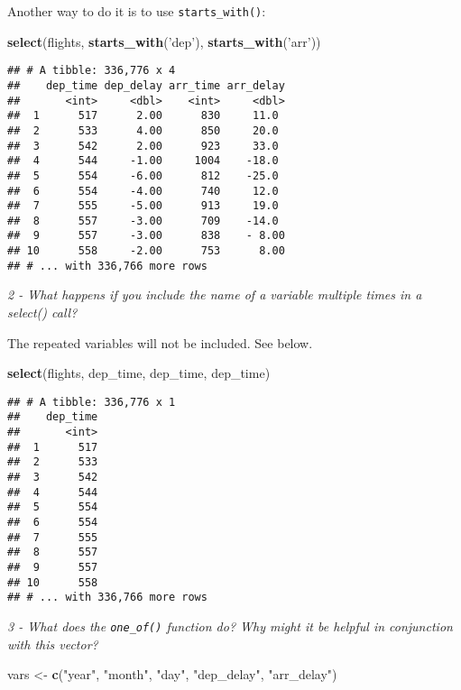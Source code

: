 \documentclass[]{article}
\newenvironment{Shaded}{\begin{snugshade}}{\end{snugshade}}
\newcommand{\KeywordTok}[1]{\textcolor[rgb]{0.13,0.29,0.53}{\textbf{#1}}}
\newcommand{\StringTok}[1]{\textcolor[rgb]{0.31,0.60,0.02}{#1}}
\newcommand{\NormalTok}[1]{#1}
\theoremstyle{definition}
\theoremstyle{definition}
\theoremstyle{definition}
\theoremstyle{remark}
\begin{document}
Another way to do it is to use \texttt{starts\_with()}:

\begin{Shaded}
\begin{Highlighting}[]
\KeywordTok{select}\NormalTok{(flights, }\KeywordTok{starts_with}\NormalTok{(}\StringTok{'dep'}\NormalTok{), }\KeywordTok{starts_with}\NormalTok{(}\StringTok{'arr'}\NormalTok{))}
\end{Highlighting}
\end{Shaded}

\begin{verbatim}
## # A tibble: 336,776 x 4
##    dep_time dep_delay arr_time arr_delay
##       <int>     <dbl>    <int>     <dbl>
##  1      517      2.00      830     11.0 
##  2      533      4.00      850     20.0 
##  3      542      2.00      923     33.0 
##  4      544     -1.00     1004    -18.0 
##  5      554     -6.00      812    -25.0 
##  6      554     -4.00      740     12.0 
##  7      555     -5.00      913     19.0 
##  8      557     -3.00      709    -14.0 
##  9      557     -3.00      838    - 8.00
## 10      558     -2.00      753      8.00
## # ... with 336,766 more rows
\end{verbatim}

\emph{2 - What happens if you include the name of a variable multiple
times in a select() call?}

The repeated variables will not be included. See below.

\begin{Shaded}
\begin{Highlighting}[]
\KeywordTok{select}\NormalTok{(flights, dep_time, dep_time, dep_time)}
\end{Highlighting}
\end{Shaded}

\begin{verbatim}
## # A tibble: 336,776 x 1
##    dep_time
##       <int>
##  1      517
##  2      533
##  3      542
##  4      544
##  5      554
##  6      554
##  7      555
##  8      557
##  9      557
## 10      558
## # ... with 336,766 more rows
\end{verbatim}

\emph{3 - What does the \texttt{one\_of()} function do? Why might it be
helpful in conjunction with this vector?}

\begin{Shaded}
\begin{Highlighting}[]
\NormalTok{vars <-}\StringTok{ }\KeywordTok{c}\NormalTok{(}\StringTok{"year"}\NormalTok{, }\StringTok{"month"}\NormalTok{, }\StringTok{"day"}\NormalTok{, }\StringTok{"dep_delay"}\NormalTok{, }\StringTok{"arr_delay"}\NormalTok{)}
\end{Highlighting}
\end{Shaded}
\end{document}
